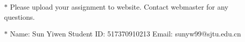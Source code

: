 \documentclass[12pt,a4paper]{article}
\theoremstyle{definition}
\begin{document}
\noindent

\noindent{}
\begin{center}
\footnotesize{\color{red}$*$ Please upload your assignment to website. Contact webmaster for any questions.}

\footnotesize{\color{blue}$*$ Name: Sun Yiwen  \quad Student ID: 517370910213 \quad Email: sunyw99@sjtu.edu.cn}
\end{center}
\end{document}
